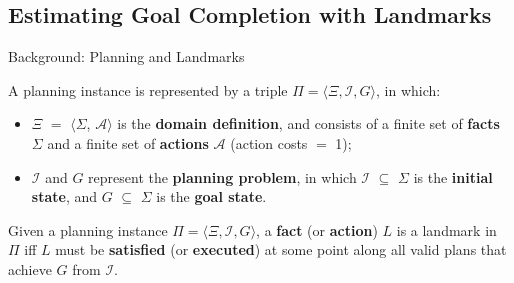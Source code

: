\documentclass{beamer}
\begin{document}
\subsection{Estimating Goal Completion with Landmarks}
	
    \begin{frame}{Background: Planning and Landmarks}
		\begin{definition} 
			A planning instance is represented by a triple $\Pi = \langle \Xi, \mathcal{I}, G\rangle$, in which:
			\begin{itemize}
				\item $\Xi$ $=$ $\langle$$\Sigma$, $\mathcal{A}$$\rangle$ is the \textbf{domain definition}, and consists of a finite set of \textbf{facts} $\Sigma$ and a finite set of \textbf{actions} $\mathcal{A}$ (action costs $=$ 1);
				\item $\mathcal{I}$ and $G$ represent the \textbf{planning problem}, in which $\mathcal{I}$ $\subseteq$ $\Sigma$ is the \textbf{initial state}, and $G$ $\subseteq$ $\Sigma$ is the \textbf{goal state}.
			\end{itemize}
		\end{definition}
		\begin{definition}
			Given a planning instance $\Pi = \langle \Xi, \mathcal{I}, G\rangle$, a \textbf{fact} (or \textbf{action}) $L$ is a landmark in $\Pi$ iff $L$ 	must be \textbf{satisfied} (or \textbf{executed}) at some point along all valid plans that achieve $G$ from $\mathcal{I}$.
		\end{definition}
    \end{frame}	
	
\end{document}
